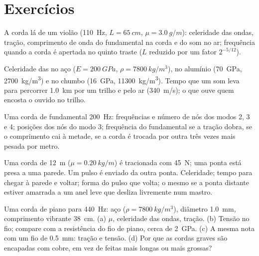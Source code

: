 \section{Exercícios}

\begin{exercise}[$\star$]\label{exo:b2:waves-on-strings:1}
A corda lá de um violão (\qty{110}{Hz}, $L = \qty{65}{cm}$, $\mu = \qty{3.0}{g/m}$):
celeridade das ondas, tração, comprimento de onda do fundamental na corda e
do som no ar; frequência quando a corda é apertada no quinto
traste ($L$ reduzido por um fator $2^{-5/12}$).
\end{exercise}

\begin{exercise}[$\star$]\label{exo:b2:waves-on-strings:2}
Celeridade das  no aço ($E = \qty{200}{GPa}$, $\rho =
\qty{7800}{kg/m^3}$), no alumínio (\qty{70}{GPa}, \qty{2700}{kg/m^3}) e no chumbo
(\qty{16}{GPa}, \qty{11300}{kg/m^3}). Tempo que um som leva para percorrer \qty{1.0}{km}
por um trilho e pelo ar (\qty{340}{m/s}); o que ouve quem encosta o
ouvido no trilho.
\end{exercise}

\begin{exercise}[$\star$]\label{exo:b2:waves-on-strings:3}
Uma corda de fundamental \qty{200}{Hz}: frequências e número de nós dos
modos 2, 3 e 4; posições dos nós do modo 3; frequência do
fundamental se a tração dobra, se o comprimento cai à metade, se a
corda é trocada por outra três vezes mais pesada por metro.
\end{exercise}

\begin{exercise}[$\star$]\label{exo:b2:waves-on-strings:4}
Uma corda de \qty{12}{m} ($\mu = \qty{0.20}{kg/m}$) é tracionada com \qty{45}{N}; uma
ponta está presa a uma parede. Um pulso é enviado da outra ponta. Celeridade;
tempo para chegar à parede e voltar; forma do pulso que volta;
o mesmo se a ponta distante estiver amarrada a um anel leve que desliza livremente num
mastro.
\end{exercise}

\begin{exercise}[$\star\star$]\label{exo:b2:waves-on-strings:5}
Uma corda de piano para \qty{440}{Hz}: aço ($\rho = \qty{7800}{kg/m^3}$),
diâmetro \qty{1.0}{mm}, comprimento vibrante \qty{38}{cm}. (a) $\mu$, celeridade das ondas,
tração. (b) Tensão no fio; compare com a resistência do fio de
piano, cerca de \qty{2}{GPa}. (c) A mesma nota com um fio de \qty{0.5}{mm}: tração
e tensão. (d) Por que as cordas graves são encapadas com cobre, em vez de feitas
mais longas ou mais grossas?
\end{exercise}

